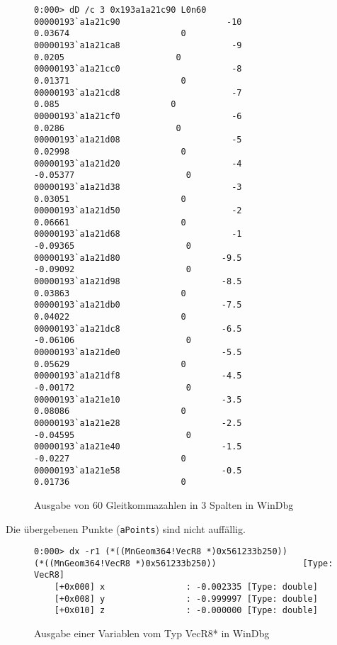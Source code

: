 \begin{figure}[H]
\begin{lstlisting}
0:000> dD /c 3 0x193a1a21c90 L0n60
00000193`a1a21c90                     -10                0.03674                      0
00000193`a1a21ca8                      -9                 0.0205                      0
00000193`a1a21cc0                      -8                0.01371                      0
00000193`a1a21cd8                      -7                  0.085                      0
00000193`a1a21cf0                      -6                 0.0286                      0
00000193`a1a21d08                      -5                0.02998                      0
00000193`a1a21d20                      -4               -0.05377                      0
00000193`a1a21d38                      -3                0.03051                      0
00000193`a1a21d50                      -2                0.06661                      0
00000193`a1a21d68                      -1               -0.09365                      0
00000193`a1a21d80                    -9.5               -0.09092                      0
00000193`a1a21d98                    -8.5                0.03863                      0
00000193`a1a21db0                    -7.5                0.04022                      0
00000193`a1a21dc8                    -6.5               -0.06106                      0
00000193`a1a21de0                    -5.5                0.05629                      0
00000193`a1a21df8                    -4.5               -0.00172                      0
00000193`a1a21e10                    -3.5                0.08086                      0
00000193`a1a21e28                    -2.5               -0.04595                      0
00000193`a1a21e40                    -1.5                -0.0227                      0
00000193`a1a21e58                    -0.5                0.01736                      0
\end{lstlisting}
\caption{Ausgabe von 60 Gleitkommazahlen in 3 Spalten in WinDbg}
\end{figure}

Die übergebenen Punkte (\verb|aPoints|) sind nicht auffällig.

\begin{figure}[H]
\begin{lstlisting}
0:000> dx -r1 (*((MnGeom364!VecR8 *)0x561233b250))
(*((MnGeom364!VecR8 *)0x561233b250))                 [Type: VecR8]
    [+0x000] x                : -0.002335 [Type: double]
    [+0x008] y                : -0.999997 [Type: double]
    [+0x010] z                : -0.000000 [Type: double]
\end{lstlisting}
\caption{Ausgabe einer Variablen vom Typ VecR8* in WinDbg}
\end{figure}


